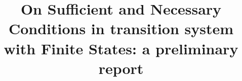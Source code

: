 \documentclass{article}
\title{On Sufficient and Necessary Conditions in transition system\\ with Finite States: a preliminary report}
\begin{document}
\newcommand{\tuple}[1]{{\langle{#1}\rangle}}
\newcommand{\Mod}{\textit{Mod}}
\newcommand\ie{{\it i.e. }}
\newcommand\eg{{\it e.g.}}
\newtheorem{definition}{Definition}
\newtheorem{examp}{Example}
\newenvironment{example}{\begin{examp}\rm}{\end{examp}}
\newtheorem{lemma}{Lemma}
\newtheorem{proposition}{Proposition}
\newtheorem{theorem}{Theorem}
\newtheorem{corollary}[theorem]{Corollary}
\newenvironment{proof}{{\bf Proof:}}{\hfill\rule{2mm}{2mm}\\ }
\newcommand{\rto}{\rightarrow}
\newcommand{\lto}{\leftarrow}
\newcommand{\lrto}{\leftrightarrow}
\newcommand{\Rto}{\Rightarrow}
\newcommand{\Lto}{\Leftarrow}
\newcommand{\LRto}{\Leftrightarrow}
\newcommand{\Var}{\textit{Var}}
\newcommand{\Forget}{\textit{Forget}}
\newcommand{\KForget}{\textit{KForget}}
\newcommand{\TForget}{\textit{TForget}}
\newcommand{\Fst}{\textit{Fst}}
\newcommand{\dep}{\textit{dep}}
\newcommand{\term}{\textit{term}}
\newcommand{\literal}{\textit{literal}}

\newcommand{\Atom}{\mathcal{A}}
\newcommand{\SFive}{\textbf{S5}}
\newcommand{\MPK}{\textsc{k}}
\newcommand{\MPB}{\textsc{b}}
\newcommand{\MPT}{\textsc{t}}
\newcommand{\MPA}{\forall}
\newcommand{\MPE}{\exists}

\newcommand{\DNF}{\textit{DNF}}
\newcommand{\CNF}{\textit{CNF}}

\newcommand{\degree}{\textit{degree}}
\newcommand{\sunfold}{\textit{sunfold}}

\newcommand{\Pos}{\textit{Pos}}
\newcommand{\Neg}{\textit{Neg}}
\newcommand\wrt{{\it w.r.t.}}
\newcommand{\Hm} {{\cal M}}
\newcommand{\Hw} {{\cal W}}
\newcommand{\Hr} {{\cal R}}
\newcommand{\Hb} {{\cal B}}
\newcommand{\Ha} {{\cal A}}

\newcommand{\Dsj}{\triangledown}

\newcommand{\wnext}{\widetilde{\bigcirc}}
\newcommand{\nex}{\bigcirc}
\newcommand{\ness}{\square}
\newcommand{\qness}{\boxminus}
\newcommand{\wqnext}{\widetilde{\circleddash}}
\newcommand{\qnext}{\circleddash}
\newcommand{\may}{\lozenge}
\newcommand{\qmay}{\blacklozenge}
\newcommand{\unt} {{\cal U}}
\newcommand{\since} {{\cal S}}
\newcommand{\SNF} {\textit{SNF$_C$}}
\newcommand{\start}{\textbf{start}}
\newcommand{\Elm}{\textit{Elm}}
\newcommand{\simp}{\textbf{simp}}
\newcommand{\nnf}{\textbf{nnf}}

\newcommand{\CTL}{\textrm{CTL}}
\newcommand{\Ind}{\textrm{Ind}}
\newcommand{\Tran}{\textrm{Tran}}
\newcommand{\Sub}{\textrm{Sub}}
\newcommand{\forget}{{\textsc{f}_\CTL}}
\newcommand{\ALL}{\textsc{a}}
\newcommand{\EXIST}{\textsc{e}}
\newcommand{\NEXT}{\textsc{x}}
\newcommand{\FUTURE}{\textsc{f}}
\newcommand{\UNTIL}{\textsc{u}}
\newcommand{\GLOBAL}{\textsc{g}}
\newcommand{\UNLESS}{\textsc{w}}
\newcommand{\Def}{\textrm{def}}
\newcommand{\IR}{\textrm{IR}}
\newcommand{\Tr}{\textrm{Tr}}
\newcommand{\dis}{\textrm{dis}}
\def\PP{\ensuremath{\textbf{PP}}}
\def\NgP{\ensuremath{\textbf{NP}}}
\def\W{\ensuremath{\textbf{W}}}
\newcommand{\Pre}{\textrm{Pre}}
\newcommand{\Post}{\textrm{Post}}
\end{document}
